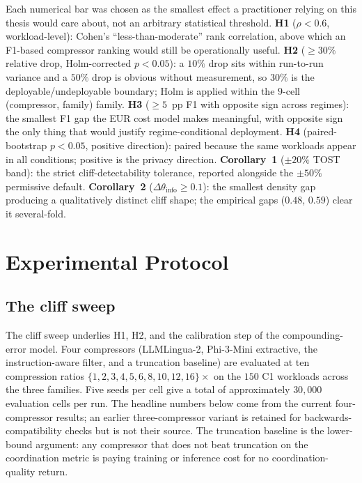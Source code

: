 Each numerical bar was chosen as the smallest effect a practitioner
relying on this thesis would care about, not an arbitrary statistical
threshold. \textbf{H1} ($\rho<0.6$, workload-level): Cohen's
``less-than-moderate'' rank correlation, above which an F1-based
compressor ranking would still be operationally useful. \textbf{H2}
($\ge30\%$ relative drop, Holm-corrected $p<0.05$): a $10\%$ drop sits
within run-to-run variance and a $50\%$ drop is obvious without
measurement, so $30\%$ is the deployable/undeployable boundary; Holm is
applied within the $9$-cell (compressor, family) family. \textbf{H3}
($\ge5$~pp F1 with opposite sign across regimes): the smallest F1 gap
the EUR cost model makes meaningful, with opposite sign the only thing
that would justify regime-conditional deployment. \textbf{H4}
(paired-bootstrap $p<0.05$, positive direction): paired because the same
workloads appear in all conditions; positive is the privacy direction.
\textbf{Corollary~1} ($\pm20\%$ TOST band): the strict
cliff-detectability tolerance, reported alongside the $\pm50\%$
permissive default. \textbf{Corollary~2}
($\Delta\theta_\text{info}\ge0.1$): the smallest density gap producing a
qualitatively distinct cliff shape; the empirical gaps ($0.48$, $0.59$)
clear it several-fold.

\section{Experimental Protocol}
\label{sec:protocol}

\subsection{The cliff sweep}

The cliff sweep underlies H1, H2, and the calibration step of the
compounding-error model. Four compressors (LLMLingua-2,
Phi-3-Mini extractive, the instruction-aware filter, and a
truncation baseline) are evaluated at ten compression ratios
$\{1, 2, 3, 4, 5, 6, 8, 10, 12, 16\}\times$ on the $150$ C1
workloads across the three families. Five seeds per cell give a
total of approximately $30{,}000$ evaluation cells per run. The
headline numbers below come from the current four-compressor
results; an earlier three-compressor variant is retained for
backwards-compatibility checks but is not their source. The
truncation baseline is the lower-bound argument: any compressor
that does not beat truncation on the coordination metric is paying
training or inference cost for no coordination-quality return.

